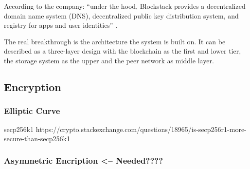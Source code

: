 According to the company: \enquote{under the hood, Blockstack provides a decentralized domain name system (DNS), decentralized public key distribution system, and registry for apps and user identities} \cite{BlockStackMainPage}.

The real breakthrough is the architecture the system is built on. It can be described as a three-layer design with the blockchain as the first and lower tier, the storage system as the upper and the peer network as middle layer.

\subsection{Encryption}
\subsubsection{Elliptic Curve}
secp256k1
https://crypto.stackexchange.com/questions/18965/is-secp256r1-more-secure-than-secp256k1

\subsubsection{Asymmetric Encription <-- Needed????}



